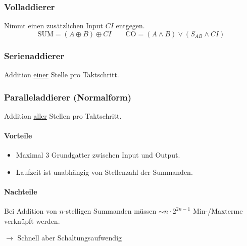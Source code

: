 \subsubsection{Volladdierer}
Nimmt einen zusätzlichen Input $CI$ entgegen.
\begin{equation*}
    \text{SUM} = (A \oplus B) \oplus CI \qquad \text{CO} = (A \land B) \lor (S_{AB} \land CI) 
\end{equation*}

\subsubsection{Serienaddierer}
Addition \underline{einer} Stelle pro Taktschritt.

\subsubsection{Paralleladdierer (Normalform)}
Addition \underline{aller} Stellen pro Taktschritt.
\begin{center}
    \small
    \begin{minipage}[t]{0.45\linewidth}
        \paragraph{Vorteile}
        \begin{itemize}
            \item Maximal 3 Grundgatter zwischen Input und Output.
            \item Laufzeit ist unabhängig von Stellenzahl der Summanden.
        \end{itemize}
    \end{minipage}
    \hfill
    \begin{minipage}[t]{0.45\linewidth}
        \paragraph{Nachteile}
            Bei Addition von $n$-stelligen Summanden müssen $\sim n \cdot 2^{2n - 1}$ Min-/Maxterme verknüpft werden.
    \end{minipage}
\end{center}
$\rightarrow$ Schnell aber Schaltungsaufwendig


